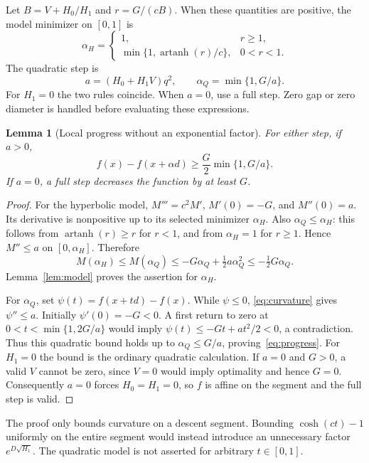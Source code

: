 \documentclass[11pt]{article}
\newtheorem{lemma}[theorem]{Lemma}
\DeclareMathOperator{\artanh}{artanh}
\begin{document}
Let $B=V+H_0/H_1$ and $r=G/(cB)$. When these quantities are positive,
the model minimizer on $[0,1]$ is
\begin{equation}\label{eq:hyperbolic}
 \alpha_H=\begin{cases}
 1,&r\ge1,\\
 \min\{1,\artanh(r)/c\},&0<r<1.
 \end{cases}
\end{equation}
The quadratic step is
\begin{equation}\label{eq:quadratic}
 a=(H_0+H_1V)q^2,\qquad \alpha_Q=\min\{1,G/a\}.
\end{equation}
For $H_1=0$ the two rules coincide. When $a=0$, use a full step.
Zero gap or zero diameter is handled before evaluating these expressions.

\begin{lemma}[Local progress without an exponential factor]\label{lem:progress}
For either step, if $a>0$,
\begin{equation}\label{eq:progress}
 f(x)-f(x+\alpha d)\ge\frac G2\min\{1,G/a\}.
\end{equation}
If $a=0$, a full step decreases the function by at least $G$.
\end{lemma}
\begin{proof}
For the hyperbolic model, $M'''=c^2M'$, $M'(0)=-G$, and $M''(0)=a$.
Its derivative is nonpositive up to its selected minimizer $\alpha_H$.
Also $\alpha_Q\le\alpha_H$: this follows from $\artanh(r)\ge r$ for
$r<1$, and from $\alpha_H=1$ for $r\ge1$. Hence $M''\le a$ on
$[0,\alpha_H]$. Therefore
\[
 M(\alpha_H)\le M(\alpha_Q)\le-G\alpha_Q+\tfrac12a\alpha_Q^2
 \le-\tfrac12G\alpha_Q.
\]
Lemma~\ref{lem:model} proves the assertion for $\alpha_H$.

For $\alpha_Q$, set $\psi(t)=f(x+td)-f(x)$. While $\psi\le0$,
\eqref{eq:curvature} gives $\psi''\le a$. Initially $\psi'(0)=-G<0$.
A first return to zero at $0<t<\min\{1,2G/a\}$ would imply
$\psi(t)\le-Gt+at^2/2<0$, a contradiction. Thus this quadratic bound
holds up to $\alpha_Q\le G/a$, proving~\eqref{eq:progress}.
For $H_1=0$ the bound is the ordinary quadratic calculation.
If $a=0$ and $G>0$, a valid $V$ cannot be zero, since
$V=0$ would imply optimality and hence $G=0$. Consequently $a=0$ forces
$H_0=H_1=0$, so $f$ is affine on the segment and the full step is valid.
\end{proof}

The proof only bounds curvature on a descent segment. Bounding
$\cosh(ct)-1$ uniformly on the entire segment would instead introduce
an unnecessary factor $e^{D\sqrt{H_1}}$. The quadratic model is not
asserted for arbitrary $t\in[0,1]$.
\end{document}
